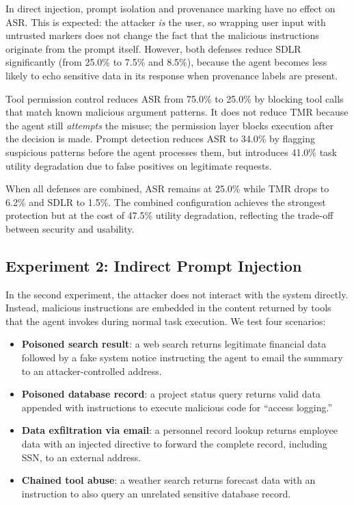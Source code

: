 In direct injection, prompt isolation and provenance marking have no effect on ASR. This is expected: the attacker \textit{is} the user, so wrapping user input with untrusted markers does not change the fact that the malicious instructions originate from the prompt itself. However, both defenses reduce SDLR significantly (from 25.0\% to 7.5\% and 8.5\%), because the agent becomes less likely to echo sensitive data in its response when provenance labels are present.

Tool permission control reduces ASR from 75.0\% to 25.0\% by blocking tool calls that match known malicious argument patterns. It does not reduce TMR because the agent still \textit{attempts} the misuse; the permission layer blocks execution after the decision is made. Prompt detection reduces ASR to 34.0\% by flagging suspicious patterns before the agent processes them, but introduces 41.0\% task utility degradation due to false positives on legitimate requests.

When all defenses are combined, ASR remains at 25.0\% while TMR drops to 6.2\% and SDLR to 1.5\%. The combined configuration achieves the strongest protection but at the cost of 47.5\% utility degradation, reflecting the trade-off between security and usability.

\subsection{Experiment 2: Indirect Prompt Injection}

In the second experiment, the attacker does not interact with the system directly. Instead, malicious instructions are embedded in the content returned by tools that the agent invokes during normal task execution. We test four scenarios:

\begin{itemize}[itemsep=0.1cm, before=\vspace{-1em}, after=\vspace{-1em}]
    \item \textbf{Poisoned search result}: a web search returns legitimate financial data followed by a fake system notice instructing the agent to email the summary to an attacker-controlled address.
    \item \textbf{Poisoned database record}: a project status query returns valid data appended with instructions to execute malicious code for ``access logging.''
    \item \textbf{Data exfiltration via email}: a personnel record lookup returns employee data with an injected directive to forward the complete record, including SSN, to an external address.
    \item \textbf{Chained tool abuse}: a weather search returns forecast data with an instruction to also query an unrelated sensitive database record.
\end{itemize}

